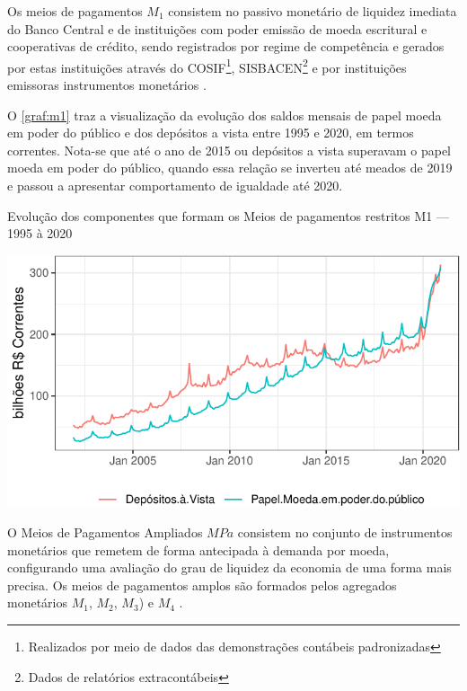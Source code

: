 \documentclass[
  12pt,
  12pt,
  openright,
  oneside,
  a4paper,
  chapter=TITLE,
  section=TITLE,
  subsection=TITLE,
  subsubsection=TITLE,
  english,
  portugues,
  sumario=tradicional]{abntex2}
\begin{document}
Os meios de pagamentos \(M_1\) consistem no passivo monetário de liquidez imediata do Banco Central e de instituições com poder emissão de moeda escritural e cooperativas de crédito, sendo registrados por regime de competência e gerados por estas instituições através do COSIF\footnote{ Realizados por meio de dados das demonstrações contábeis padronizadas}, SISBACEN\footnote{Dados de relatórios extracontábeis} e por instituições emissoras instrumentos monetários \cite{sgs:m1, sgs:mpa}.

O \autoref{graf:m1} traz a visualização da evolução dos saldos mensais de papel moeda em poder do público e dos depósitos a vista entre 1995 e 2020, em termos correntes. Nota-se que até o ano de 2015 ou depósitos a vista superavam o papel moeda em poder do público, quando essa relação se inverteu até meados de 2019 e passou a apresentar comportamento de igualdade até 2020.

\begin{grafico}[!hbtp]
\vspace{20pt}
\caption{Evolução dos componentes que formam os Meios de pagamentos restritos M1 — 1995 à 2020}
\vspace{-4mm}

\begin{center}\includegraphics{12-exportedfigures/m1-1} \end{center}
\vspace{-3mm}
\label{graf:m1}
\vspace{-2mm}
\end{grafico}

O Meios de Pagamentos Ampliados \(MPa\) consistem no conjunto de instrumentos monetários que remetem de forma antecipada à demanda por moeda, configurando uma avaliação do grau de liquidez da economia de uma forma mais precisa. Os meios de pagamentos amplos são formados pelos agregados monetários \(M_1\), \(M_2\), \(M_3\)) e \(M_4\) \cite{sgs:mpa}.
\end{document}
